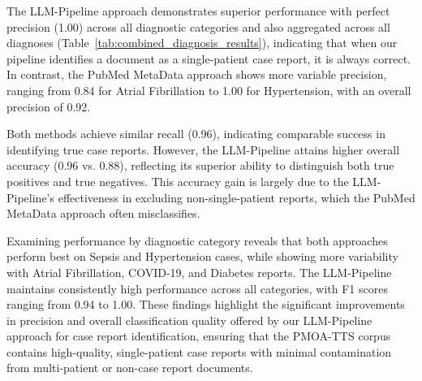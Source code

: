 The LLM-Pipeline approach demonstrates superior performance with perfect precision (1.00) across all diagnostic categories and also aggregated across all diagnoses (Table~\ref{tab:combined_diagnosis_results}), indicating that when our pipeline identifies a document as a single-patient case report, it is always correct. In contrast, the PubMed MetaData approach shows more variable precision, ranging from 0.84 for Atrial Fibrillation to 1.00 for Hypertension, with an overall precision of 0.92.

Both methods achieve similar recall (0.96), indicating comparable success in identifying true case reports.
However, the LLM-Pipeline attains higher overall accuracy (0.96 vs. 0.88), reflecting its superior ability to distinguish both true positives and true negatives. This accuracy gain is largely due to the LLM-Pipeline’s effectiveness in excluding non-single-patient reports, which the PubMed MetaData approach often misclassifies.

Examining performance by diagnostic category reveals that both approaches perform best on Sepsis and Hypertension cases, while showing more variability with Atrial Fibrillation, COVID-19, and Diabetes reports. The LLM-Pipeline maintains consistently high performance across all categories, with F1 scores ranging from 0.94 to 1.00. These findings highlight the significant improvements in precision and overall classification quality offered by our LLM-Pipeline approach for case report identification, ensuring that the PMOA-TTS corpus contains high-quality, single-patient case reports with minimal contamination from multi-patient or non-case report documents.




